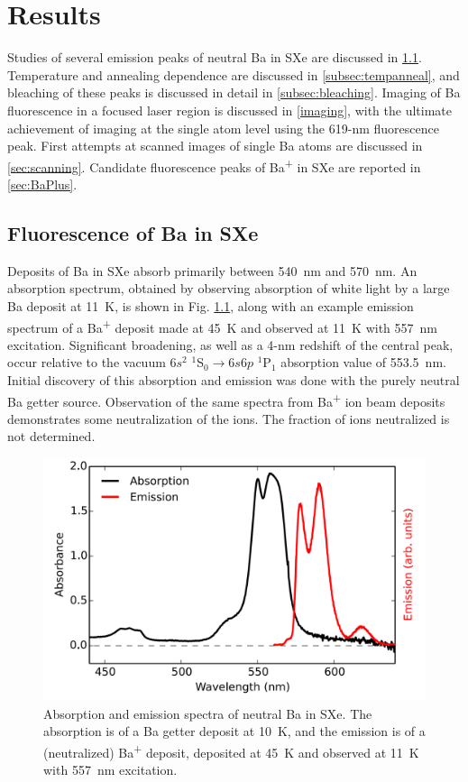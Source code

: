 \chapter{Results}

Studies of several emission peaks of neutral Ba in SXe are discussed in \ref{sec:fluorescence}.  Temperature and annealing dependence are discussed in \ref{subsec:tempanneal}, and bleaching of these peaks is discussed in detail in \ref{subsec:bleaching}.  Imaging of Ba fluorescence in a focused laser region is discussed in \ref{imaging}, with the ultimate achievement of imaging at the single atom level using the 619-nm fluorescence peak.  First attempts at scanned images of single Ba atoms are discussed in \ref{sec:scanning}.  Candidate fluorescence peaks of Ba\textsuperscript{+} in SXe are reported in \ref{sec:BaPlus}.

\section{Fluorescence of Ba in SXe}
\label{sec:fluorescence}

Deposits of Ba in SXe absorb primarily between 540~nm and 570~nm.  An absorption spectrum, obtained by observing absorption of white light by a large Ba deposit at 11~K, is shown in Fig. \ref{fig:BaAbs}, along with an example emission spectrum of a Ba\textsuperscript{+} deposit made at 45~K and observed at 11~K with 557~nm excitation.  Significant broadening, as well as a 4-nm redshift  of the central peak, occur relative to the vacuum $6s^{2}$ $^{1}$S$_{0} \rightarrow 6s6p$ $^{1}$P$_{1}$ absorption value of 553.5~nm.  Initial discovery of this absorption and emission was done with the purely neutral Ba getter source.  Observation of the same spectra from Ba\textsuperscript{+} ion beam deposits demonstrates some neutralization of the ions.  The fraction of ions neutralized is not determined.  \cite{Mong2015,Shon,Brian}

\begin{figure} %
        \centering
                \includegraphics[width=.7\textwidth]{figures/BaAbs_fromBaSpec.png}
                \caption{Absorption and emission spectra of neutral Ba in SXe.  The absorption is of a Ba getter deposit at 10~K, and the emission is of a (neutralized) Ba\textsuperscript{+} deposit, deposited at 45~K and observed at 11~K with 557~nm excitation.\cite{Mong2015}}
\label{fig:BaAbs}
\end{figure}

